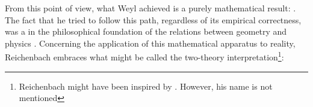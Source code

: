 \documentclass[final]{article}
\begin{document}
From this point of view, what Weyl achieved is a purely mathematical result:  \citep[365]{Reichenbach1922a}. The fact that he tried to follow this path, regardless of its empirical correctness, was a  in the philosophical foundation of the relations between geometry and physics \citep[367f.]{Reichenbach1921}. Concerning the application of this mathematical apparatus to reality, Reichenbach embraces what might be called the two-theory interpretation\footnote{Reichenbach might have been inspired by \citet{Pauli1921}. However, his name is not mentioned}:
\end{document}
